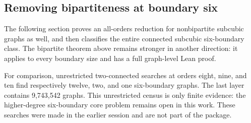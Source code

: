 \subsection{Removing bipartiteness at boundary six}
The following section proves an all-orders reduction for nonbipartite
subcubic graphs as well, and then classifies the entire connected subcubic
six-boundary class. The bipartite theorem above remains stronger in another
direction: it applies to every boundary size and has a full graph-level
Lean proof.

For comparison, unrestricted two-connected searches at orders eight, nine,
and ten find respectively twelve, two, and one six-boundary graphs. The
last layer contains 9,743,542 graphs. This unrestricted census is only
finite evidence: the higher-degree six-boundary core problem remains open
in this work. These searches were made in the earlier session and are
not part of the package.
